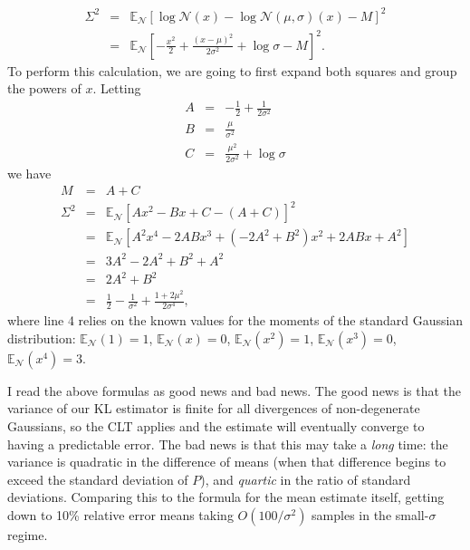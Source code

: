 \documentclass[12pt]{article}
\newcommand{\E}{\mathbb{E}}
\newcommand{\N}{\mathcal{N}}
\begin{document}
\begin{eqnarray*}
 \Sigma^2 & = & \E_\N\left[ \log \N(x) - \log \N(\mu,\sigma)(x) - M \right]^2 \\
 & = & \E_\N \left[ -\frac{x^2}{2} + \frac{(x-\mu)^2}{2\sigma^2} + \log \sigma - M \right]^2.
\end{eqnarray*}
To perform this calculation, we are going to first expand both squares
and group the powers of $x$.  Letting
\begin{eqnarray*}
 A & = & -\frac{1}{2} + \frac{1}{2 \sigma^2} \\
 B & = & \frac{\mu}{\sigma^2} \\
 C & = & \frac{\mu^2}{2\sigma^2} + \log \sigma
\end{eqnarray*}
we have
\begin{eqnarray*}
 M & = & A + C \\
 \Sigma^2 & = & \E_\N \left[ A x^2 - B x + C - (A + C)\right]^2 \\
 & = & \E_\N \left[ A^2 x^4 - 2 A B x^3 + \left(-2A^2 + B^2\right) x^2 + 2 A B x + A^2 \right] \\
 & = & 3A^2 -2A^2 + B^2 + A^2 \\
 & = & 2A^2 + B^2 \\
 & = & \frac{1}{2} - \frac{1}{\sigma^2} + \frac{1 + 2\mu^2}{2\sigma^4},
\end{eqnarray*}
where line 4 relies on the known values for the moments of the
standard Gaussian distribution: $\E_\N(1) = 1$, $\E_\N(x) = 0$,
$\E_\N(x^2) = 1$, $\E_\N(x^3) = 0$, $\E_\N(x^4) = 3$.

I read the above formulas as good news and bad news.  The good news is
that the variance of our KL estimator is finite for all divergences of
non-degenerate Gaussians, so the CLT applies and the estimate will
eventually converge to having a predictable error.  The bad news is
that this may take a \emph{long} time: the variance is quadratic in
the difference of means (when that difference begins to exceed the
standard deviation of $P$), and \emph{quartic} in the ratio of
standard deviations.  Comparing this to the formula for the mean
estimate itself, getting down to 10\% relative error means taking
$O(100 / \sigma^2)$ samples in the small-$\sigma$ regime.
\end{document}
